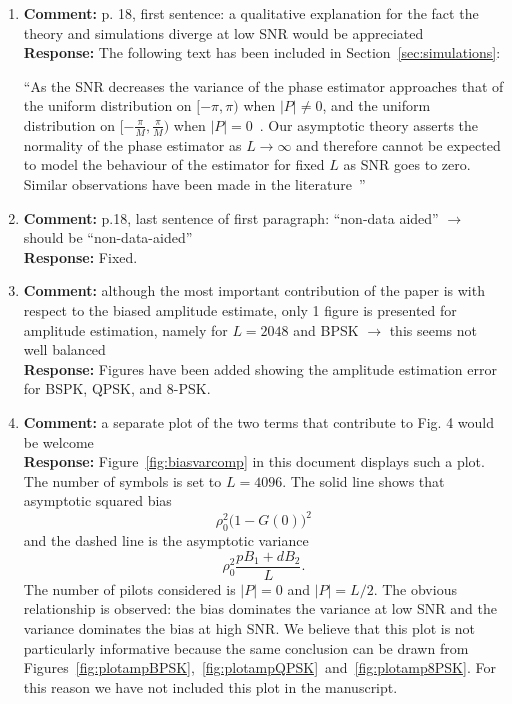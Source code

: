 \documentclass{article}
\newcommand{\abs}[1]{{\left\vert #1 \right\vert}}
\begin{document}
\begin{enumerate}
\item \textbf{Comment:} p. 18, first sentence: a qualitative explanation for the fact the theory and simulations diverge at low SNR would be appreciated  \\
\textbf{Response:} The following text has been included in Section~\ref{sec:simulations}:

``As the SNR decreases the variance of the phase estimator approaches that of the uniform distribution on $[-\pi, \pi)$ when $\abs{P} \neq 0$, and the uniform distribution on $[-\tfrac{\pi}{M}, \tfrac{\pi}{M})$ when $\abs{P}=0$~\cite{McKilliam_leastsqPSKnoncoICASSP_2012}.  Our asymptotic theory asserts the normality of the phase estimator as $L\to\infty$ and therefore cannot be expected to model the behaviour of the estimator for fixed $L$ as SNR goes to zero.  Similar observations have been made in the literature~\cite{ViterbiViterbi_phase_est_1983,6365847}''

\item \textbf{Comment:} p.18, last sentence of first paragraph: ``non-data aided'' $\to$ should be ``non-data-aided''  \\
\textbf{Response:} Fixed.

\item \textbf{Comment:}  although the most important contribution of the paper is with respect to the biased amplitude estimate, only 1 figure is presented for amplitude estimation, namely for $L=2048$ and BPSK $\to$ this seems not well balanced  \\
\textbf{Response:} Figures have been added showing the amplitude estimation error for BSPK, QPSK, and 8-PSK.

\item \textbf{Comment:}  a separate plot of the two terms that contribute to Fig. 4 would be welcome \\

\textbf{Response:} Figure~\ref{fig:biasvarcomp} in this document displays such a plot.  The number of symbols is set to $L=4096$.  The solid line shows that asymptotic squared bias 
\[
\rho_0^2\big(1 - G(0)\big)^2
\]
and the dashed line is the asymptotic variance
\[
\rho_0^2\frac{p B_1 + d B_2}{L}.
\]
The number of pilots considered is $\abs{P}=0$ and $\abs{P}=L/2$.  The obvious relationship is observed: the bias dominates the variance at low SNR and the variance dominates the bias at high SNR.  We believe that this plot is not particularly informative because the same conclusion can be drawn from Figures~\ref{fig:plotampBPSK},~\ref{fig:plotampQPSK}~and~\ref{fig:plotamp8PSK}.  For this reason we have not included this plot in the manuscript.
  
\end{enumerate} 
\end{document}
